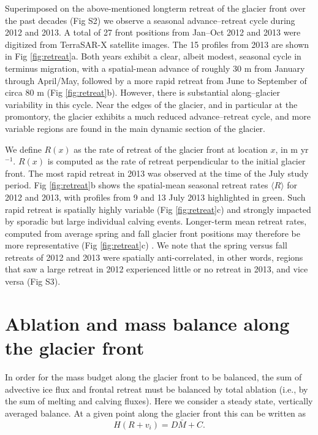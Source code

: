 \documentclass[10pt,letterpaper]{article}
\newcommand{\be}[0]{\begin{equation}}
\newcommand{\ee}[0]{\end{equation}}
\begin{document}
Superimposed on the above-mentioned longterm retreat of the glacier front over the past decades (Fig S2) we observe a seasonal advance--retreat cycle during 2012 and 2013. A total of 27 front positions from Jan--Oct 2012 and 2013 were digitized from TerraSAR-X satellite images. The 15 profiles from 2013 are shown in Fig \ref{fig:retreat}a. Both years exhibit a clear, albeit modest, seasonal cycle in terminus migration, with a spatial-mean advance of roughly 30 m from January through April/May, followed by a more rapid retreat from June to September of circa 80 m (Fig \ref{fig:retreat}b). However, there is substantial along--glacier variability in this cycle. Near the edges of the glacier, and in particular at the promontory, the glacier exhibits a much reduced advance--retreat cycle, and more variable regions are found in the main dynamic section of the glacier. 

We define $R(x)$ as the rate of retreat of the glacier front at location $x$, in m yr$^{-1}$. $R(x)$ is computed as the rate of retreat perpendicular to the initial glacier front. The most rapid retreat in 2013 was observed at the time of the July study period. Fig \ref{fig:retreat}b shows the spatial-mean seasonal retreat rates $\langle R \rangle$ for 2012 and 2013, with profiles from 9 and 13 July 2013 highlighted in green. Such rapid retreat is spatially highly variable (Fig \ref{fig:retreat}c) and strongly impacted by sporadic but large individual calving events. Longer-term mean retreat rates, computed from average spring and fall glacier front positions may therefore be more representative (Fig \ref{fig:retreat}c) . We note that the spring versus fall retreats of 2012 and 2013 were spatially anti-correlated, in other words, regions that saw a large retreat in 2012 experienced little or no retreat in 2013, and vice versa (Fig S3). 

\section{Ablation and mass balance along the glacier front}

In order for the mass budget along the glacier front to be balanced, the sum of advective ice flux and frontal retreat must be balanced by total ablation (i.e., by the sum of melting and calving fluxes). Here we consider a steady state, vertically averaged balance. At a given point along the glacier front this can be written as
\be
H\left(R + v_i \right) = D\bar{M} + C. \label{eq:mb}
\ee
\end{document}
